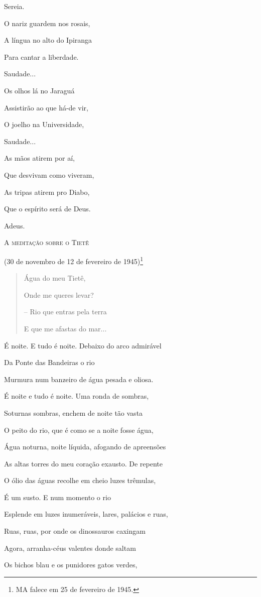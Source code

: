 Sereia.

O nariz guardem nos rosais,

A língua no alto do Ipiranga

Para cantar a liberdade.

Saudade...

Os olhos lá no Jaraguá

Assistirão ao que há-de vir,

O joelho na Universidade,

Saudade...

As mãos atirem por aí,

Que desvivam como viveram,

As tripas atirem pro Diabo,

Que o espírito será de Deus.

Adeus.

\textsc{A meditação sobre o Tietê}

(30 de novembro de 12 de fevereiro de 1945)\footnote{MA falece em 25 de
  fevereiro de 1945.}

\begin{quote}
Água do meu Tietê,

Onde me queres levar?

-- Rio que entras pela terra

E que me afastas do mar...
\end{quote}

É noite. E tudo é noite. Debaixo do arco admirável

Da Ponte das Bandeiras o rio

Murmura num banzeiro de água pesada e oliosa.

É noite e tudo é noite. Uma ronda de sombras,

Soturnas sombras, enchem de noite tão vasta

O peito do rio, que é como se a noite fosse água,

Água noturna, noite líquida, afogando de apreensões

As altas torres do meu coração exausto. De repente

O ólio das águas recolhe em cheio luzes trêmulas,

É um susto. E num momento o rio

Esplende em luzes inumeráveis, lares, palácios e ruas,

Ruas, ruas, por onde os dinossauros caxingam

Agora, arranha-céus valentes donde saltam

Os bichos blau e os punidores gatos verdes,

